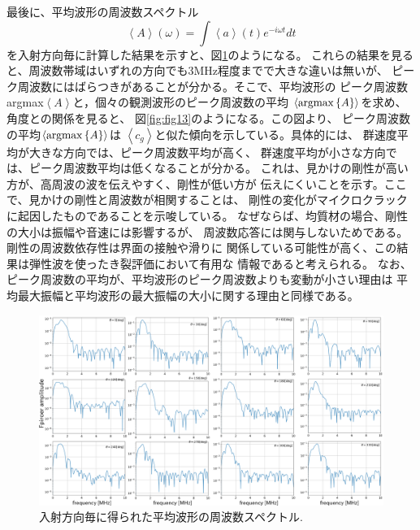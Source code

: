 最後に、平均波形の周波数スペクトル
\begin{equation}
	\left< A \right> (\omega) = \int \left<a\right>(t)e^{-i\omega t}dt
	\label{eqn:ave_A}
\end{equation}
を入射方向毎に計算した結果を示すと、図\ref{fig:fig11_2}のようになる。
これらの結果を見ると、周波数帯域はいずれの方向でも3MHz程度までで大きな違いは無いが、
ピーク周波数にはばらつきがあることが分かる。そこで、平均波形の
ピーク周波数argmax$\left< A \right>$と，個々の観測波形のピーク周波数の平均
$\left< {\rm argmax }\left\{ A \right\}\right>$を求め、角度との関係を見ると、
図\ref{fig:fig13}のようになる。この図より、
ピーク周波数の平均$\left< {\rm argmax }\left\{ A \right\}\right>$は
$\left< c_g\right>$と似た傾向を示している。具体的には、
群速度平均が大きな方向では、ピーク周波数平均が高く、
群速度平均が小さな方向では、ピーク周波数平均は低くなることが分かる。
これは、見かけの剛性が高い方が、高周波の波を伝えやすく、剛性が低い方が
伝えにくいことを示す。ここで、見かけの剛性と周波数が相関することは、
剛性の変化がマイクロクラックに起因したものであることを示唆している。
なぜならば、均質材の場合、剛性の大小は振幅や音速には影響するが、
周波数応答には関与しないためである。剛性の周波数依存性は界面の接触や滑りに
関係している可能性が高く、この結果は弾性波を使ったき裂評価において有用な
情報であると考えられる。
なお、ピーク周波数の平均が、平均波形のピーク周波数よりも変動が小さい理由は
平均最大振幅と平均波形の最大振幅の大小に関する理由と同様である。
\begin{figure}[h]
	\begin{center}
	\includegraphics[width=1.0\linewidth]{Figs/fig11_2.eps} 
	\end{center}
	\caption{
		入射方向毎に得られた平均波形の周波数スペクトル.
	} 
	\label{fig:fig11_2}
\end{figure}
